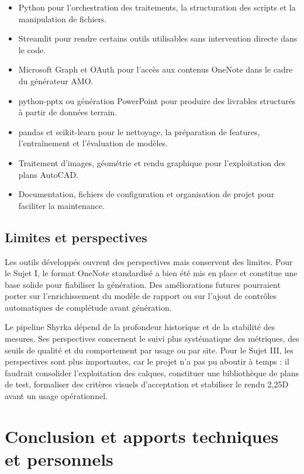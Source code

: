 \documentclass[12pt]{article}
\begin{document}
\begin{itemize}
    \item Python pour l’orchestration des traitements, la structuration des scripts et la manipulation de fichiers. 
    \item Streamlit pour rendre certains outils utilisables sans intervention directe dans le code. 
    \item Microsoft Graph et OAuth pour l’accès aux contenus OneNote dans le cadre du générateur AMO. 
    \item python-pptx ou génération PowerPoint pour produire des livrables structurés à partir de données terrain. 
    \item pandas et scikit-learn pour le nettoyage, la préparation de features, l’entraînement et l’évaluation de modèles. 
    \item Traitement d’images, géométrie et rendu graphique pour l’exploitation des plans AutoCAD. 
    \item Documentation, fichiers de configuration et organisation de projet pour faciliter la maintenance. 
\end{itemize}

\subsection{Limites et perspectives}

Les outils développés ouvrent des perspectives mais conservent des limites. Pour le Sujet I, le format OneNote standardisé a bien été mis en place et constitue une base solide pour fiabiliser la génération. Des améliorations futures pourraient porter sur l’enrichissement du modèle de rapport ou sur l’ajout de contrôles automatiques de complétude avant génération. 

Le pipeline Shyrka dépend de la profondeur historique et de la stabilité des mesures. Ses perspectives concernent le suivi plus systématique des métriques, des seuils de qualité et du comportement par usage ou par site. Pour le Sujet III, les perspectives sont plus importantes, car le projet n’a pas pu aboutir à temps : il faudrait consolider l’exploitation des calques, constituer une bibliothèque de plans de test, formaliser des critères visuels d’acceptation et stabiliser le rendu 2,25D avant un usage opérationnel. 

\newpage
\section{Conclusion et apports techniques et personnels}
\end{document}
